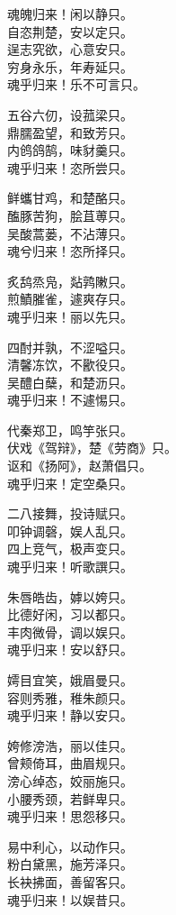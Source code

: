 \documentclass[]{article}
\begin{document}
魂魄归来！闲以静只。\\
自恣荆楚，安以定只。\\
逞志究欲，心意安只。\\
穷身永乐，年寿延只。\\
魂乎归来！乐不可言只。

五谷六仞，设菰梁只。\\
鼎臑盈望，和致芳只。\\
内鸧鸽鹄，味豺羹只。\\
魂乎归来！恣所尝只。

鲜蠵甘鸡，和楚酪只。\\
醢豚苦狗，脍苴蒪只。\\
吴酸蒿蒌，不沾薄只。\\
魂兮归来！恣所择只。

炙鸹烝凫，煔鹑敶只。\\
煎鰿膗雀，遽爽存只。\\
魂乎归来！丽以先只。

四酎并孰，不涩嗌只。\\
清馨冻饮，不歠役只。\\
吴醴白蘖，和楚沥只。\\
魂乎归来！不遽惕只。

代秦郑卫，鸣竽张只。\\
伏戏《驾辩》，楚《劳商》只。\\
讴和《扬阿》，赵萧倡只。\\
魂乎归来！定空桑只。

二八接舞，投诗赋只。\\
叩钟调磬，娱人乱只。\\
四上竞气，极声变只。\\
魂乎归来！听歌譔只。

朱唇皓齿，嫭以姱只。\\
比德好闲，习以都只。\\
丰肉微骨，调以娱只。\\
魂乎归来！安以舒只。

嫮目宜笑，娥眉曼只。\\
容则秀雅，稚朱颜只。\\
魂乎归来！静以安只。

姱修滂浩，丽以佳只。\\
曾颊倚耳，曲眉规只。\\
滂心绰态，姣丽施只。\\
小腰秀颈，若鲜卑只。\\
魂乎归来！思怨移只。

易中利心，以动作只。\\
粉白黛黑，施芳泽只。\\
长袂拂面，善留客只。\\
魂乎归来！以娱昔只。
\end{document}
